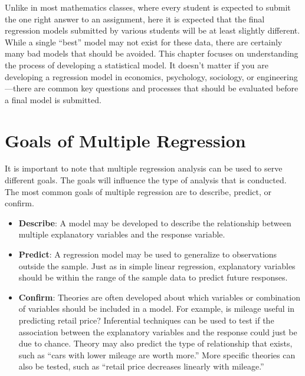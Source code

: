 \documentclass[
]{report}
\providecommand{\tightlist}{%
  \setlength{\itemsep}{0pt}\setlength{\parskip}{0pt}}
\theoremstyle{definition}
\theoremstyle{definition}
\theoremstyle{definition}
\theoremstyle{definition}
\theoremstyle{remark}
\begin{document}
Unlike in most mathematics classes, where every student is expected to submit the one right answer to an assignment, here it is expected that the final regression models submitted by various students will be at least slightly different. While a single ``best'' model may not exist for these data, there are certainly many bad models that should be avoided. This chapter focuses on understanding the process of developing a statistical
model. It doesn't matter if you are developing a regression model in economics, psychology, sociology, or engineering---there are common key questions and processes that should be evaluated before a final model is submitted.

\newpage

\hypertarget{goals-of-multiple-regression}{%
\section{Goals of Multiple Regression}\label{goals-of-multiple-regression}}

It is important to note that multiple regression analysis can be used to serve different goals. The goals will influence the type of analysis that is conducted. The most common goals of multiple regression are to describe, predict, or confirm.

\begin{itemize}
\tightlist
\item
  \textbf{Describe}: A model may be developed to describe the relationship between multiple explanatory variables and the response variable.
\item
  \textbf{Predict}: A regression model may be used to generalize to observations outside the sample. Just as in simple linear regression, explanatory variables should be within the range of the sample data to predict future responses.
\item
  \textbf{Confirm}: Theories are often developed about which variables or combination of variables should be included in a model. For example, is mileage useful in predicting retail price? Inferential techniques can be used to test if the association between the explanatory variables and the response could just be due to chance. Theory may also predict the type of relationship that exists, such as ``cars with lower mileage are worth more.'' More specific theories can also be tested, such as ``retail price decreases linearly with mileage.''
\end{itemize}
\end{document}
